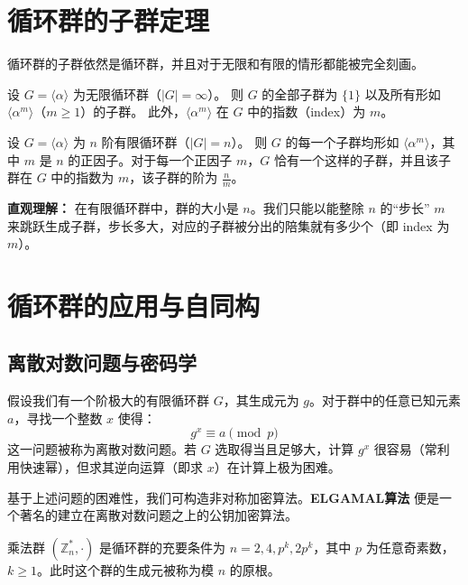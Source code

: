 \documentclass[11pt]{article}
\begin{document}
\section{循环群的子群定理}

循环群的子群依然是循环群，并且对于无限和有限的情形都能被完全刻画。

\begin{cntheorem}[无限循环群的子群]
设 $G = \langle \alpha \rangle$ 为无限循环群（$|G| = \infty$）。
则 $G$ 的全部子群为 $\{1\}$ 以及所有形如 $\langle \alpha^m \rangle$（$m \ge 1$）的子群。
此外，$\langle \alpha^m \rangle$ 在 $G$ 中的指数（index）为 $m$。
\end{cntheorem}

\begin{cntheorem}[有限循环群的子群]
设 $G = \langle \alpha \rangle$ 为 $n$ 阶有限循环群（$|G| = n$）。
则 $G$ 的每一个子群均形如 $\langle \alpha^m \rangle$，其中 $m$ 是 $n$ 的正因子。对于每一个正因子 $m$，$G$ 恰有一个这样的子群，并且该子群在 $G$ 中的指数为 $m$，该子群的阶为 $\frac{n}{m}$。
\end{cntheorem}
\textbf{直观理解：} 在有限循环群中，群的大小是 $n$。我们只能以能整除 $n$ 的“步长” $m$ 来跳跃生成子群，步长多大，对应的子群被分出的陪集就有多少个（即 index 为 $m$）。

\section{循环群的应用与自同构}

\subsection{离散对数问题与密码学}

\begin{cndefinition}
假设我们有一个阶极大的有限循环群 $G$，其生成元为 $g$。对于群中的任意已知元素 $a$，寻找一个整数 $x$ 使得：
$$ g^x \equiv a \pmod{p} $$
这一问题被称为离散对数问题。若 $G$ 选取得当且足够大，计算 $g^x$ 很容易（常利用快速幂），但求其逆向运算（即求 $x$）在计算上极为困难。
\end{cndefinition}

基于上述问题的困难性，我们可构造非对称加密算法。\textbf{ELGAMAL算法} 便是一个著名的建立在离散对数问题之上的公钥加密算法。

\begin{cnproperty}
乘法群 $(\mathbb{Z}_n^*, \cdot)$ 是循环群的充要条件为 $n = 2, 4, p^k, 2p^k$，其中 $p$ 为任意奇素数，$k \ge 1$。此时这个群的生成元被称为模 $n$ 的原根。
\end{cnproperty}
\end{document}
